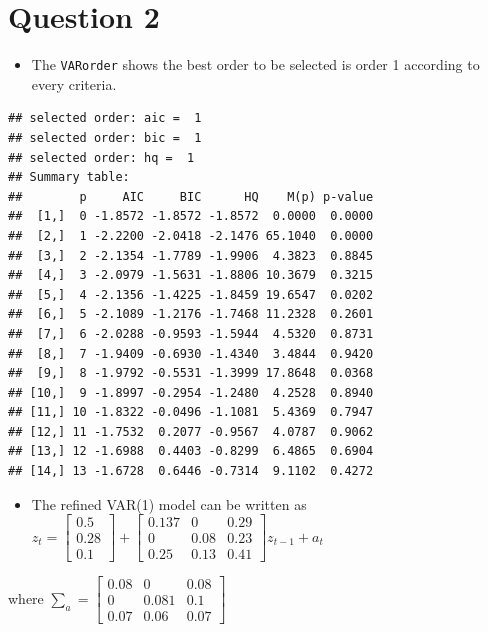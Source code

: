 \documentclass[]{article}
\providecommand{\tightlist}{%
  \setlength{\itemsep}{0pt}\setlength{\parskip}{0pt}}
\begin{document}
\section{Question 2}\label{question-2}

\begin{itemize}
\tightlist
\item
  The \texttt{VARorder} shows the best order to be selected is order 1
  according to every criteria.
\end{itemize}

\begin{verbatim}
## selected order: aic =  1 
## selected order: bic =  1 
## selected order: hq =  1 
## Summary table:  
##        p     AIC     BIC      HQ    M(p) p-value
##  [1,]  0 -1.8572 -1.8572 -1.8572  0.0000  0.0000
##  [2,]  1 -2.2200 -2.0418 -2.1476 65.1040  0.0000
##  [3,]  2 -2.1354 -1.7789 -1.9906  4.3823  0.8845
##  [4,]  3 -2.0979 -1.5631 -1.8806 10.3679  0.3215
##  [5,]  4 -2.1356 -1.4225 -1.8459 19.6547  0.0202
##  [6,]  5 -2.1089 -1.2176 -1.7468 11.2328  0.2601
##  [7,]  6 -2.0288 -0.9593 -1.5944  4.5320  0.8731
##  [8,]  7 -1.9409 -0.6930 -1.4340  3.4844  0.9420
##  [9,]  8 -1.9792 -0.5531 -1.3999 17.8648  0.0368
## [10,]  9 -1.8997 -0.2954 -1.2480  4.2528  0.8940
## [11,] 10 -1.8322 -0.0496 -1.1081  5.4369  0.7947
## [12,] 11 -1.7532  0.2077 -0.9567  4.0787  0.9062
## [13,] 12 -1.6988  0.4403 -0.8299  6.4865  0.6904
## [14,] 13 -1.6728  0.6446 -0.7314  9.1102  0.4272
\end{verbatim}

\begin{itemize}
\tightlist
\item
  The refined VAR(1) model can be written as
  \(z_{t} = \left[\begin{array}{ccc}0.5 \\ 0.28 \\ 0.1\end{array}\right] + \left[\begin{array}{rrr}0.137 & 0 & 0.29 \\0 & 0.08 & 0.23 \\0.25 & 0.13 & 0.41\end{array}\right]z_{t-1} + a_{t}\)
\end{itemize}

where
\(\sum_{a} = \left[\begin{array}{rrr}0.08 & 0 & 0.08\\0 & 0.081 & 0.1 \\ 0.07 & 0.06 & 0.07\end{array}\right]\)
\end{document}
